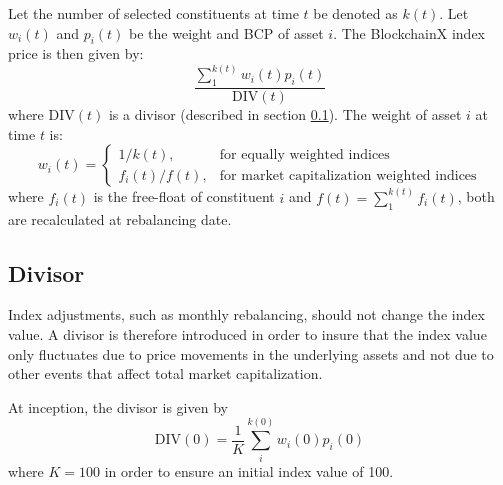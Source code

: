 \documentclass{article}
\begin{document}


Let the number of selected constituents at time $t$ be denoted as $k(t)$. 
Let $w_i(t)$ and $p_i(t)$ be the weight and BCP of asset $i$.
The BlockchainX index price is then given by:
\begin{equation}
  \frac{  \sum_{1}^{k(t)} w_i(t) p_{i}(t)  }{\text{DIV}(t)}
\label{eq:index}
\end{equation}
where $\text{DIV}(t)$ is a divisor (described in section \ref{sec:divisor}). The weight of asset $i$ at time $t$ is:
\begin{equation}
w_i(t)=
\begin{cases}
    1 / k(t), & \text{for equally weighted indices} \\
    f_{i}(t) /f(t),  & \text{for market capitalization weighted indices}
\end{cases}
\end{equation}
where  $f_{i}(t)$ is the free-float of constituent $i$ and $f(t)=\sum_1^{k(t)}f_i(t)$, both are recalculated at rebalancing date.

\subsection{Divisor}\label{sec:divisor}

Index adjustments, such as monthly rebalancing, should not change the index value. A divisor is therefore introduced in order to insure that the index value only fluctuates due to price movements in the underlying assets and not due to other events that affect total market capitalization.

At inception, the divisor is given by
\begin{equation}  
  \text{DIV}(0) = \frac{1}{K} \sum_{i}^{k(0)} w_i(0) p_{i}(0)
  \label{eq:initial_divisor}
\end{equation}
where $K=100$ in order to ensure an initial index value of 100. 
\end{document}
